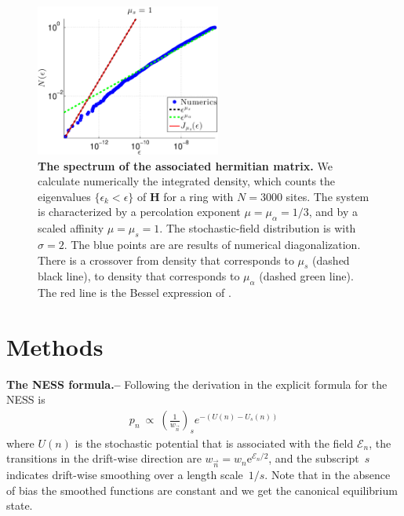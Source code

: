 \documentclass[aps,pre,floats,floatfix,twocolumn]{revtex4}
\newcommand{\eexp}[1]{\mathrm{e}^{#1}}
\newcommand{\beq}{\begin{eqnarray}}
\newcommand{\eeq}{\end{eqnarray}}
\newcommand{\sect}[1]{{\bf #1.-- }}
\begin{document}
\begin{figure}
\includegraphics[height=5cm]{N_E_1_1_french}

\caption{\label{fdos}
{\bf The spectrum of the associated hermitian matrix.}
We calculate numerically the integrated density, 
which counts the eigenvalues ${\{\epsilon_k<\epsilon\}}$ of $\bm{H}$ 
for a ring with $N{=}3000$ sites. 
The system is characterized by a percolation exponent ${\mu=\mu_{\alpha}=1/3}$, 
and by a scaled affinity ${\mu=\mu_s=1}$. 
The stochastic-field distribution is with $\sigma{=}2$. 
The blue points are are results of numerical diagonalization. 
There is a crossover from density that corresponds to $\mu_s$ (dashed black line), 
to density that corresponds to $\mu_{\alpha}$ (dashed green line). 
The red line is the Bessel expression of \cite{odh3}. 
}
\end{figure}




\section{Methods}  



\sect{The NESS formula}
%
Following the derivation in \cite{nes} the explicit formula for the NESS is   
%
\beq
p_n \ \propto \ \left( \frac{1}{w_{\overrightarrow{n}}}\right)_s e^{-\left(U(n)-U_s(n)\right)}
\eeq
%
where $U(n)$ is the stochastic potential that is associated with the field $\mathcal{E}_n$, 
the transitions in the drift-wise direction are $w_{\overrightarrow{n}}=w_n\eexp{\mathcal{E}_n/2}$, 
and the subscript~$s$ indicates drift-wise smoothing over a length scale~$1/s$. 
Note that in the absence of bias the smoothed functions are constant and we get the canonical equilibrium state.    
\\
\end{document}
